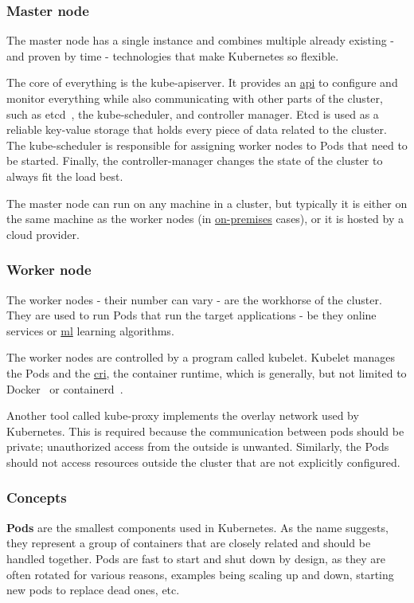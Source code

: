 \subsubsection{Master node}
The master node has a single instance and combines multiple already existing - and proven by time - technologies that make Kubernetes so flexible.

The core of everything is the kube-apiserver. It provides an \underline{\gls{api}} to configure and monitor everything while also communicating with other parts of the cluster, such as etcd~\cite{etcd}, the kube-scheduler, and controller manager. Etcd is used as a reliable key-value storage that holds every piece of data related to the cluster. The kube-scheduler is responsible for assigning worker nodes to Pods that need to be started. Finally, the controller-manager changes the state of the cluster to always fit the load best.

The master node can run on any machine in a cluster, but typically it is either on the same machine as the worker nodes (in \underline{\gls{on-premises}} cases), or it is hosted by a cloud provider.

\subsubsection{Worker node}
The worker nodes - their number can vary - are the workhorse of the cluster. They are used to run Pods that run the target applications - be they online services or \underline{\gls{ml}} learning algorithms.

The worker nodes are controlled by a program called kubelet. Kubelet manages the Pods and the \underline{\gls{cri}}, the container runtime, which is generally, but not limited to Docker~\cite{docker} or containerd~\cite{containerd}.

Another tool called kube-proxy implements the overlay network used by Kubernetes. This is required because the communication between pods should be private; unauthorized access from the outside is unwanted. Similarly, the Pods should not access resources outside the cluster that are not explicitly configured.

\subsubsection{Concepts}
\textbf{Pods} are the smallest components used in Kubernetes. As the name suggests, they represent a group of containers that are closely related and should be handled together. Pods are fast to start and shut down by design, as they are often rotated for various reasons, examples being scaling up and down, starting new pods to replace dead ones, etc. \\

